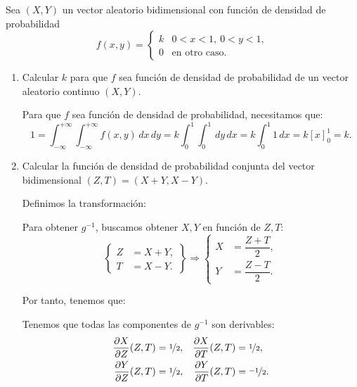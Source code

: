 \begin{ejercicio}
    Sea $(X,Y)$ un vector aleatorio bidimensional con función de densidad de probabilidad
    \begin{equation*}
        f(x, y) = \begin{cases}
            k & 0<x<1,~0<y<1, \\
            0 & \text{en otro caso}.
        \end{cases}
    \end{equation*}
    \begin{enumerate}
        \item Calcular $k$ para que $f$ sea función de densidad de probabilidad de un vector aleatorio continuo $(X,Y)$.
        
        Para que $f$ sea función de densidad de probabilidad, necesitamos que:
        \begin{equation*}
            1=\int_{-\infty}^{+\infty} \int_{-\infty}^{+\infty} f(x, y) \, dx \, dy = k\int_{0}^{1} \int_{0}^{1} \, dy \, dx = k\int_{0}^{1} 1 \, dx = k\left[x\right]_0^1 = k.
        \end{equation*}
        \item Calcular la función de densidad de probabilidad conjunta del vector bidimensional $(Z,T)=(X+Y,X-Y)$.
        
        Definimos la transformación:

        Para obtener $g^{-1}$, buscamos obtener $X,Y$ en función de $Z,T$:
        \begin{equation*}
            \left\{\begin{aligned}
                Z&=X+Y, \\
                T&=X-Y.
            \end{aligned}\right\}\Longrightarrow
            \left\{\begin{aligned}
                X&=\dfrac{Z+T}{2}, \\
                Y&=\dfrac{Z-T}{2}.
            \end{aligned}\right.
        \end{equation*}

        Por tanto, tenemos que:

        Tenemos que todas las componentes de $g^{-1}$ son derivables:
        \begin{align*}
            \dfrac{\partial X}{\partial Z}(Z,T)&=\nicefrac{1}{2}, & \dfrac{\partial X}{\partial T}(Z,T)&=\nicefrac{1}{2},\\
            \dfrac{\partial Y}{\partial Z}(Z,T)&=\nicefrac{1}{2}, & \dfrac{\partial Y}{\partial T}(Z,T)&=\nicefrac{-1}{2}.
        \end{align*}


\end{enumerate}
\end{ejercicio}
